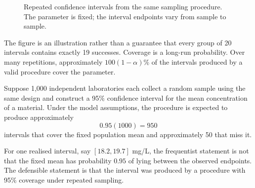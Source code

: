 \begin{figure}[htbp]
\centering
{}
\caption{Repeated confidence intervals from the same sampling procedure. The parameter is fixed; the interval endpoints vary from sample to sample.}
\label{fig:ci-coverage}
\end{figure}

The figure is an illustration rather than a guarantee that every group of 20 intervals contains exactly 19 successes. Coverage is a long-run probability. Over many repetitions, approximately $100(1-\alpha)\%$ of the intervals produced by a valid procedure cover the parameter.

\begin{example}\par
Suppose 1,000 independent laboratories each collect a random sample using the same design and construct a 95\% confidence interval for the mean concentration of a material. Under the model assumptions, the procedure is expected to produce approximately
\[
    0.95(1000)=950
\]
intervals that cover the fixed population mean and approximately 50 that miss it.

For one realised interval, say $[18.2,19.7]$ mg/L, the frequentist statement is not that the fixed mean has probability $0.95$ of lying between the observed endpoints. The defensible statement is that the interval was produced by a procedure with 95\% coverage under repeated sampling.
\end{example}

